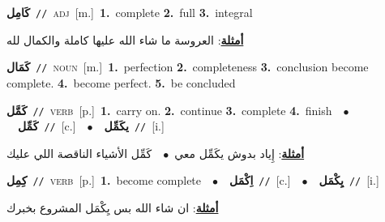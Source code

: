\documentclass[10pt,a4paper,twoside]{article} %
\begin{document}
\begin{multicols}{2}
{\setlength\topsep{0pt}\textbf{\foreignlanguage{arabic}{كَامِل}}\ {\color{gray}\texttt{//}\color{black}}\ \textsc{adj}\ [m.]\ \textbf{1.}~complete  \textbf{2.}~full  \textbf{3.}~integral\  \begin{flushright}\color{gray}\foreignlanguage{arabic}{\textbf{\underline{\foreignlanguage{arabic}{أمثلة}}}: العروسة ما شاء الله عليها كاملة والكمال لله}\end{flushright}\color{black}} \vspace{2mm}

{\setlength\topsep{0pt}\textbf{\foreignlanguage{arabic}{كَمَال}}\ {\color{gray}\texttt{//}\color{black}}\ \textsc{noun}\ [m.]\ \textbf{1.}~perfection  \textbf{2.}~completeness  \textbf{3.}~conclusion become complete.  \textbf{4.}~become perfect.  \textbf{5.}~be concluded\ } \vspace{2mm}

{\setlength\topsep{0pt}\textbf{\foreignlanguage{arabic}{كَمَّل}}\ {\color{gray}\texttt{//}\color{black}}\ \textsc{verb}\ [p.]\ \textbf{1.}~carry on.  \textbf{2.}~continue  \textbf{3.}~complete  \textbf{4.}~finish\ \ $\bullet$\ \ \setlength\topsep{0pt}\textbf{\foreignlanguage{arabic}{كَمِّل}}\ {\color{gray}\texttt{//}\color{black}}\ [c.]\ \ $\bullet$\ \ \setlength\topsep{0pt}\textbf{\foreignlanguage{arabic}{يكَمِّل}}\ {\color{gray}\texttt{//}\color{black}}\ [i.]\  \begin{flushright}\color{gray}\foreignlanguage{arabic}{\textbf{\underline{\foreignlanguage{arabic}{أمثلة}}}: إِياد بدوش يكَمِّل معي\ $\bullet$\ \  كَمِّل الأشياء الناقصة اللي عليك}\end{flushright}\color{black}} \vspace{2mm}

{\setlength\topsep{0pt}\textbf{\foreignlanguage{arabic}{كِمِل}}\ {\color{gray}\texttt{//}\color{black}}\ \textsc{verb}\ [p.]\ \textbf{1.}~become complete\ \ $\bullet$\ \ \setlength\topsep{0pt}\textbf{\foreignlanguage{arabic}{اِكْمَل}}\ {\color{gray}\texttt{//}\color{black}}\ [c.]\ \ $\bullet$\ \ \setlength\topsep{0pt}\textbf{\foreignlanguage{arabic}{يِكْمَل}}\ {\color{gray}\texttt{//}\color{black}}\ [i.]\  \begin{flushright}\color{gray}\foreignlanguage{arabic}{\textbf{\underline{\foreignlanguage{arabic}{أمثلة}}}: ان شاء الله بس يِكْمَل المشروع بخبرك}\end{flushright}\color{black}} \vspace{2mm}


\end{multicols}
\end{document}
